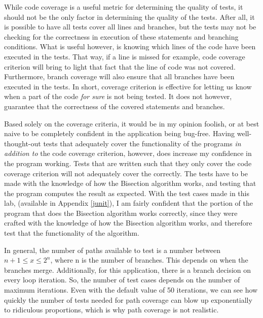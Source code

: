 While code coverage is a useful metric for determining the quality of tests, it
should not be the only factor in determining the quality of the tests. After
all, it is possible to have all tests cover all lines and branches, but the
tests may not be checking for the correctness in execution of these statements
and branching conditions.  What is useful however, is knowing which lines of
the code have been executed in the tests. That way, if a line is missed for
example, code coverage criterion will bring to light that fact that the line of
code was not covered. Furthermore, branch coverage will also ensure that all
branches have been executed in the tests. In short, coverage criterion is
effective for letting us know when a part of the code \textit{for sure} is not
being tested. It does not however, guarantee that the correctness of the
covered statements and branches.

Based solely on the coverage criteria, it would be in my opinion foolish,
or at best naive to be completely confident in the application being bug-free.
Having well-thought-out tests that adequately cover the functionality of the
programs \textit{in addition to} the code coverage criterion, however, does
increase my confidence in the program working. Tests that are written such that
they only cover the code coverage criterion will not adequately cover the
correctly. The tests have to be made with the knowledge of how the Bisection
algorithm works, and testing that the program computes the result as expected.
With the test cases made in this lab, (available in Appendix \ref{junit}),
I am fairly confident that the portion of the program that does the Bisection
algorithm works correctly, since they were crafted with the knowledge
of how the Bisection algorithm works, and therefore test that the functionality
of the algorithm.

In general, the number of paths available to test is a number between
$n+1 \leq x \leq 2^n$, where n is the number of branches. This depends
on when the branches merge. Additionally, for this application,
there is a branch decision on every loop iteration. So, the number of test
cases depends on the number of maximum iterations. Even with the default value
of 50 iterations, we can see how quickly the number of tests needed for path
coverage can blow up exponentially to ridiculous proportions, which is why
path coverage is not realistic.
